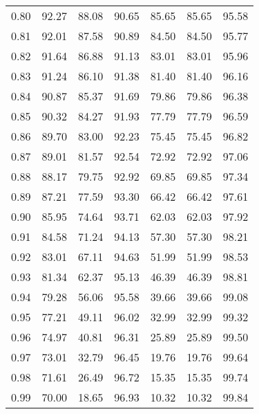 \begin{tabular}{|c|c|c|c|c|c|c|}
      0.80 &     92.27 &     88.08 &      90.65 &   85.65 &      85.65 &         95.58 \\
      0.81 &     92.01 &     87.58 &      90.89 &   84.50 &      84.50 &         95.77 \\
      0.82 &     91.64 &     86.88 &      91.13 &   83.01 &      83.01 &         95.96 \\
      0.83 &     91.24 &     86.10 &      91.38 &   81.40 &      81.40 &         96.16 \\
      0.84 &     90.87 &     85.37 &      91.69 &   79.86 &      79.86 &         96.38 \\
      0.85 &     90.32 &     84.27 &      91.93 &   77.79 &      77.79 &         96.59 \\
      0.86 &     89.70 &     83.00 &      92.23 &   75.45 &      75.45 &         96.82 \\
      0.87 &     89.01 &     81.57 &      92.54 &   72.92 &      72.92 &         97.06 \\
      0.88 &     88.17 &     79.75 &      92.92 &   69.85 &      69.85 &         97.34 \\
      0.89 &     87.21 &     77.59 &      93.30 &   66.42 &      66.42 &         97.61 \\
      0.90 &     85.95 &     74.64 &      93.71 &   62.03 &      62.03 &         97.92 \\
      0.91 &     84.58 &     71.24 &      94.13 &   57.30 &      57.30 &         98.21 \\
      0.92 &     83.01 &     67.11 &      94.63 &   51.99 &      51.99 &         98.53 \\
      0.93 &     81.34 &     62.37 &      95.13 &   46.39 &      46.39 &         98.81 \\
      0.94 &     79.28 &     56.06 &      95.58 &   39.66 &      39.66 &         99.08 \\
      0.95 &     77.21 &     49.11 &      96.02 &   32.99 &      32.99 &         99.32 \\
      0.96 &     74.97 &     40.81 &      96.31 &   25.89 &      25.89 &         99.50 \\
      0.97 &     73.01 &     32.79 &      96.45 &   19.76 &      19.76 &         99.64 \\
      0.98 &     71.61 &     26.49 &      96.72 &   15.35 &      15.35 &         99.74 \\
      0.99 &     70.00 &     18.65 &      96.93 &   10.32 &      10.32 &         99.84 \\
\bottomrule
\end{tabular}
